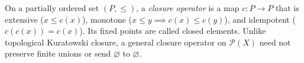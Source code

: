 
On a partially ordered set $(P,\leq)$, a \emph{closure operator} is a map $c:P\to P$ that is extensive ($x\leq c(x)$), monotone ($x\leq y\implies c(x)\leq c(y)$), and idempotent ($c(c(x))=c(x)$). Its fixed points are called closed elements. Unlike topological Kuratowski closure, a general closure operator on $\mathcal P(X)$ need not preserve finite unions or send $\varnothing$ to $\varnothing$.
